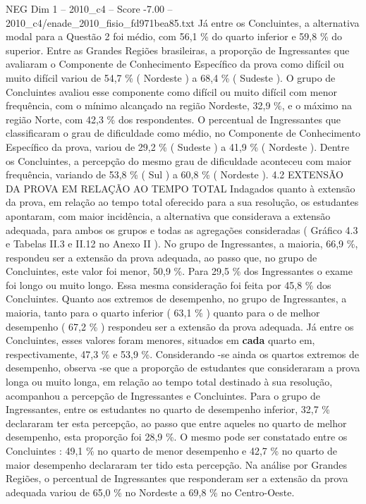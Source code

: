 \begin{textsample}{NEG Dim 1 – 2010\_c4 – Score -7.00 – 2010\_c4/enade\_2010\_fisio\_fd971bea85.txt}
Já entre os Concluintes, a alternativa modal para a Questão 2 foi médio, com 56,1 \% do quarto inferior e 59,8 \% do superior.
Entre as Grandes Regiões brasileiras, a proporção de Ingressantes que avaliaram o Componente de Conhecimento Específico da prova como difícil ou muito difícil variou de 54,7 \% ( Nordeste ) a 68,4 \% ( Sudeste ).
O grupo de Concluintes avaliou esse componente como difícil ou muito difícil com menor frequência, com o mínimo alcançado na região Nordeste, 32,9 \%, e o máximo na região Norte, com 42,3 \% dos respondentes.
O percentual de Ingressantes que classificaram o grau de dificuldade como médio, no Componente de Conhecimento Específico da prova, variou de 29,2 \% ( Sudeste ) a 41,9 \% ( Nordeste ).
Dentre os Concluintes, a percepção do mesmo grau de dificuldade aconteceu com maior frequência, variando de 53,8 \% ( Sul ) a 60,8 \% ( Nordeste ). 4.2 EXTENSÃO DA PROVA EM RELAÇÃO AO TEMPO TOTAL Indagados quanto à extensão da prova, em relação ao tempo total oferecido para a sua resolução, os estudantes apontaram, com maior incidência, a alternativa que considerava a extensão adequada, para ambos os grupos e todas as agregações consideradas ( Gráfico 4.3 e Tabelas II.3 e II.12 no Anexo II ).
No grupo de Ingressantes, a maioria, 66,9 \%, respondeu ser a extensão da prova adequada, ao passo que, no grupo de Concluintes, este valor foi menor, 50,9 \%.
Para 29,5 \% dos Ingressantes o exame foi longo ou muito longo.
Essa mesma consideração foi feita por 45,8 \% dos Concluintes.
Quanto aos extremos de desempenho, no grupo de Ingressantes, a maioria, tanto para o quarto inferior ( 63,1 \% ) quanto para o de melhor desempenho ( 67,2 \% ) respondeu ser a extensão da prova adequada.
Já entre os Concluintes, esses valores foram menores, situados em \textbf{cada} quarto em, respectivamente, 47,3 \% e 53,9 \%.
Considerando -se ainda os quartos extremos de desempenho, observa -se que a proporção de estudantes que consideraram a prova longa ou muito longa, em relação ao tempo total destinado à sua resolução, acompanhou a percepção de Ingressantes e Concluintes.
Para o grupo de Ingressantes, entre os estudantes no quarto de desempenho inferior, 32,7 \% declararam ter esta percepção, ao passo que entre aqueles no quarto de melhor desempenho, esta proporção foi 28,9 \%.
O mesmo pode ser constatado entre os Concluintes : 49,1 \% no quarto de menor desempenho e 42,7 \% no quarto de maior desempenho declararam ter tido esta percepção.
Na análise por Grandes Regiões, o percentual de Ingressantes que responderam ser a extensão da prova adequada variou de 65,0 \% no Nordeste a 69,8 \% no Centro-Oeste.

\end{textsample}
